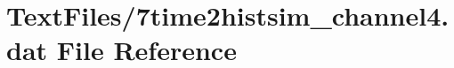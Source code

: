 \hypertarget{7time2histsim__channel4_8dat}{}\section{Text\+Files/7time2histsim\+\_\+channel4.dat File Reference}
\label{7time2histsim__channel4_8dat}
